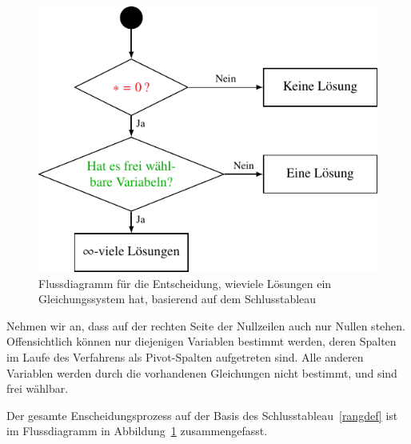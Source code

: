 \begin{figure}
\centering
\includegraphics{1/images/flussdiagrammLoesungsmenge.pdf}
\caption{Flussdiagramm für die Entscheidung, wieviele Lösungen ein
Gleichungssystem hat, basierend auf dem Schlusstableau
\label{lingl:flussdiagramm}}
\end{figure}

Nehmen wir an, dass auf der rechten Seite der Nullzeilen auch
nur Nullen stehen.
Offensichtlich können nur diejenigen Variablen bestimmt werden,
deren Spalten im Laufe des Verfahrens als Pivot-Spalten aufgetreten sind.
Alle anderen Variablen werden durch die vorhandenen Gleichungen nicht
bestimmt, und sind frei wählbar.

Der gesamte Enscheidungsprozess auf der Basis des
Schlusstableau~\eqref{rangdef} ist im Flussdiagramm
in Abbildung~\ref{lingl:flussdiagramm} zusammengefasst.

